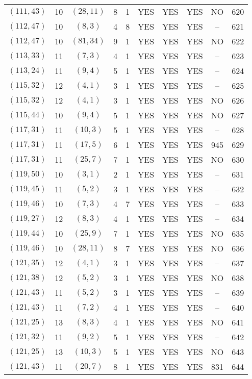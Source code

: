 \begin{longtable}{|c|c|c|c|c|c|c|c|c|c|}
$(111, 43)$ & 10 & $(28, 11)$ & 8 & 1 & YES & YES & YES & NO & 620\\
$(112, 47)$ & 10 & $(8, 3)$ & 4 & 8 & YES & YES & YES & -- & 621\\
$(112, 47)$ & 10 & $(81, 34)$ & 9 & 1 & YES & YES & YES & NO & 622\\
$(113, 33)$ & 11 & $(7, 3)$ & 4 & 1 & YES & YES & YES & -- & 623\\
$(113, 24)$ & 11 & $(9, 4)$ & 5 & 1 & YES & YES & YES & -- & 624\\
$(115, 32)$ & 12 & $(4, 1)$ & 3 & 1 & YES & YES & YES & -- & 625\\
$(115, 32)$ & 12 & $(4, 1)$ & 3 & 1 & YES & YES & YES & NO & 626\\
$(115, 44)$ & 10 & $(9, 4)$ & 5 & 1 & YES & YES & YES & NO & 627\\
$(117, 31)$ & 11 & $(10, 3)$ & 5 & 1 & YES & YES & YES & -- & 628\\
$(117, 31)$ & 11 & $(17, 5)$ & 6 & 1 & YES & YES & YES & 945 & 629\\
$(117, 31)$ & 11 & $(25, 7)$ & 7 & 1 & YES & YES & YES & NO & 630\\
$(119, 50)$ & 10 & $(3, 1)$ & 2 & 1 & YES & YES & YES & -- & 631\\
$(119, 45)$ & 11 & $(5, 2)$ & 3 & 1 & YES & YES & YES & -- & 632\\
$(119, 46)$ & 10 & $(7, 3)$ & 4 & 7 & YES & YES & YES & -- & 633\\
$(119, 27)$ & 12 & $(8, 3)$ & 4 & 1 & YES & YES & YES & -- & 634\\
$(119, 44)$ & 10 & $(25, 9)$ & 7 & 1 & YES & YES & YES & NO & 635\\
$(119, 46)$ & 10 & $(28, 11)$ & 8 & 7 & YES & YES & YES & NO & 636\\
$(121, 35)$ & 12 & $(4, 1)$ & 3 & 1 & YES & YES & YES & -- & 637\\
$(121, 38)$ & 12 & $(5, 2)$ & 3 & 1 & YES & YES & YES & NO & 638\\
$(121, 43)$ & 11 & $(5, 2)$ & 3 & 1 & YES & YES & YES & -- & 639\\
$(121, 43)$ & 11 & $(7, 2)$ & 4 & 1 & YES & YES & YES & -- & 640\\
$(121, 25)$ & 13 & $(8, 3)$ & 4 & 1 & YES & YES & YES & NO & 641\\
$(121, 32)$ & 11 & $(9, 2)$ & 5 & 1 & YES & YES & YES & -- & 642\\
$(121, 25)$ & 13 & $(10, 3)$ & 5 & 1 & YES & YES & YES & NO & 643\\
$(121, 43)$ & 11 & $(20, 7)$ & 8 & 1 & YES & YES & YES & 831 & 644\\

\end{longtable}
